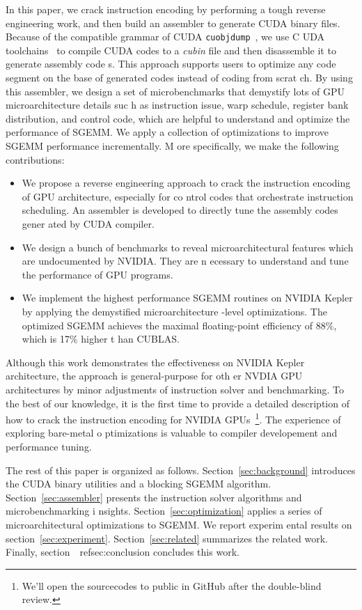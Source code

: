 In this paper, we crack instruction encoding by performing a tough reverse engineering work, and then build an assembler
 to generate CUDA binary files. Because of the compatible grammar of CUDA {\tt cuobjdump}~\cite{cubin2015util}, we use C
UDA toolchains~\cite{nvcc} to compile CUDA codes to a {\em cubin} file and then disassemble it to generate assembly code
s. This approach supports users to optimize any code segment on the base of generated codes instead of coding from scrat
ch. By using this assembler, we design a set of microbenchmarks that demystify lots of GPU microarchitecture details suc
h as instruction issue, warp schedule, register bank distribution, and control code, which are helpful to understand and
 optimize the performance of SGEMM. We apply a collection of optimizations to improve SGEMM performance incrementally. M
ore specifically, we make the following contributions:
\begin{itemize}
\item We propose a reverse engineering approach to crack the instruction encoding of GPU architecture, especially for co
ntrol codes that orchestrate instruction scheduling. An assembler is developed to directly tune the assembly codes gener
ated by CUDA compiler.
\item We design a bunch of benchmarks to reveal microarchitectural features which are undocumented by NVIDIA. They are n
ecessary to understand and tune the performance of GPU programs.
\item We implement the highest performance SGEMM routines on NVIDIA Kepler by applying the demystified microarchitecture
-level optimizations. The optimized SGEMM achieves the maximal floating-point efficiency of 88\%, which is 17\% higher t
han CUBLAS.
\end{itemize}

Although this work demonstrates the effectiveness on NVIDIA Kepler architecture, the approach is general-purpose for oth
er NVDIA GPU architectures by minor adjustments of instruction solver and benchmarking. To the best of our knowledge, it
 is the first time to provide a detailed description of how to crack the instruction encoding for NVIDIA GPUs~\footnote{
We'll open the sourcecodes to public in GitHub after the double-blind review.}. The experience of exploring bare-metal o
ptimizations is valuable to compiler developement and performance tuning.

The rest of this paper is organized as follows. Section~\ref{sec:background} introduces the CUDA binary utilities and a 
blocking SGEMM algorithm. Section~\ref{sec:assembler} presents the instruction solver algorithms and microbenchmarking i
nsights. Section~\ref{sec:optimization} applies a series of microarchitectural optimizations to SGEMM. We report experim
ental results on section~\ref{sec:experiment}. Section~\ref{sec:related} summarizes the related work. Finally, section~\
ref{sec:conclusion} concludes this work. 
